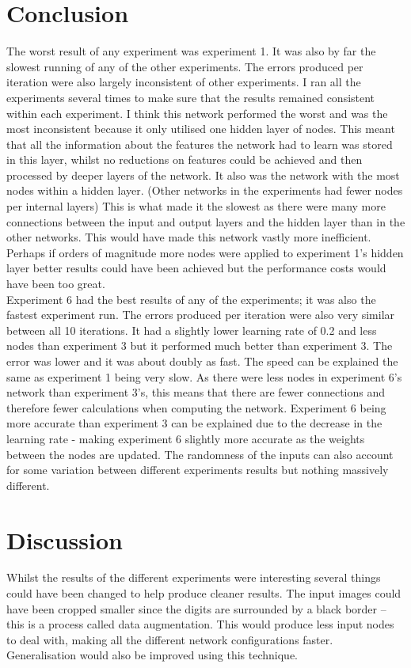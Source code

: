 \documentclass[11pt]{article}
\begin{document}
\begin{page}
\section{Conclusion}
The worst result of any experiment was experiment 1. It was also by far the slowest running of any of the other experiments. The errors produced per iteration were also largely inconsistent of other experiments. I ran all the experiments several times to make sure that the results remained consistent within each experiment. I think this network performed the worst and was the most inconsistent because it only utilised one hidden layer of nodes. This meant that all the information about the features the network had to learn was stored in this layer, whilst no reductions on features could be achieved and then processed by deeper layers of the network. It also was the network with the most nodes within a hidden layer. (Other networks in the experiments had fewer nodes per internal layers) This is what made it the slowest as there were many more connections between the input and output layers and the hidden layer than in the other networks. This would have made this network vastly more inefficient. Perhaps if orders of magnitude more nodes were applied to experiment 1's hidden layer better results could have been achieved but the performance costs would have been too great. \\

\noindent Experiment 6 had the best results of any of the experiments; it was also the fastest experiment run. The errors produced per iteration were also very similar between all 10 iterations. It had a slightly lower learning rate of 0.2 and less nodes than experiment 3 but it performed much better than experiment 3. The error was lower and it was about doubly as fast. The speed can be explained the same as experiment 1 being very slow. As there were less nodes in experiment 6’s network than experiment 3’s, this means that there are fewer connections and therefore fewer calculations when computing the network. Experiment 6 being more accurate than experiment 3 can be explained due to the decrease in the learning rate - making experiment 6 slightly more accurate as the weights between the nodes are updated. The randomness of the inputs can also account for some variation between different experiments results but nothing massively different.\\

\section{Discussion}
Whilst the results of the different experiments were interesting several things could have been changed to help produce cleaner results. The input images could have been cropped smaller since the digits are surrounded by a black border – this is a process called data augmentation. This would produce less input nodes to deal with, making all the different network configurations faster. Generalisation would also be improved using this technique.\\


\end{page}
\end{document}
